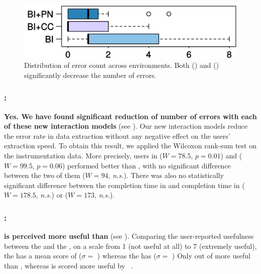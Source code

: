 \begin{figure}[t]
    \centering
    \includegraphics[width=0.6\columnwidth]{figures/error-plot1}
    \caption{Distribution of error count across environments.
        Both \ConversationalClarification{} (\ConversationalClarificationInitials) and
        \ProgramNavigation{} (\ProgramNavigationInitials) significantly decrease the number of errors.}
    \label{fig:interactive:study:errorcounts}
\end{figure}

\subsubsection*{\RQOneShort: \RQOne}
\textbf{Yes. We have found significant
reduction of number of errors with each of these new interaction models} (see ).
Our new interaction models reduce the error rate in data extraction without any
negative effect on the users' extraction speed. To obtain this result, we applied the
Wilcoxon rank-sum test on the instrumentation data.
More precisely, users in \BIDT ($W=78.5$, $p=0.01$) and \BIPW ($W= 99.5$, $p=0.06$)
performed better than \BI, with no significant
difference between the two of them ($W=94$, \textit{n.s.}).
There was also no statistically significant difference between the completion time in \BI and
completion time in \BIDT ($W=178.5$, \textit{n.s.}) or \BIPW{} ($W=173$, \textit{n.s.}).

\subsubsection*{\RQTwoShort: \RQTwo}
\textbf{\ConversationalClarification is perceived more useful than \ProgramNavigation} (see
).
Comparing the user-reported usefulness between the \ConversationalClarification and the \ProgramNavigation, on a
scale from 1 (not useful at all) to 7 (extremely useful), the
\ConversationalClarification has a mean score of \usefulnessDisambiguation{} ($\sigma =$
\usefulnessDisambiguationStdDev{})
whereas the \ProgramNavigation has \usefulnessProgramViewer{} ($\sigma =$ \usefulnessProgramViewerStdDev{})
Only  out of
\numPeopleSurvey{}
 \ProgramNavigation more useful than
\ConversationalClarification,
whereas \ConversationalClarification is scored more useful by
\numUserPreferringDisambiguation~.

